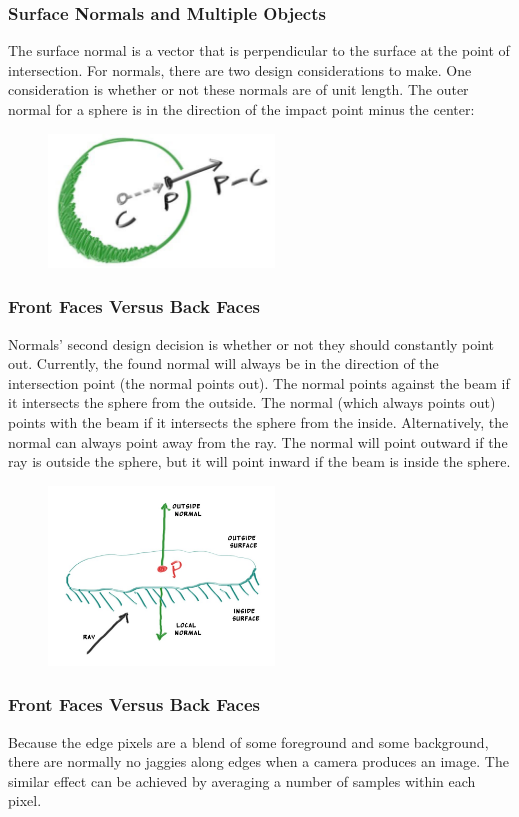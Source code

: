 \documentclass[conference]{IEEEtran}
\begin{document}
\subsubsection{Surface Normals and Multiple Objects}
The surface normal is a vector that is perpendicular to the surface at the point of intersection. For normals, there are two design considerations to make. One consideration is whether or not these normals are of unit length. The outer normal for a sphere is in the direction of the impact point minus the center:
\begin{figure}[h]
\includegraphics[width=6cm]{images/ch6-1.jpg}
\centering
\end{figure}
\subsubsection{Front Faces Versus Back Faces}
Normals' second design decision is whether or not they should constantly point out. Currently, the found normal will always be in the direction of the intersection point (the normal points out). The normal points against the beam if it intersects the sphere from the outside. The normal (which always points out) points with the beam if it intersects the sphere from the inside. Alternatively, the normal can always point away from the ray. The normal will point outward if the ray is outside the sphere, but it will point inward if the beam is inside the sphere.
\begin{figure}[h]
\includegraphics[width=6cm]{images/ch6-2.jpg}
\centering
\end{figure}
\subsubsection{Front Faces Versus Back Faces}
Because the edge pixels are a blend of some foreground and some background, there are normally no jaggies along edges when a camera produces an image. The similar effect can be achieved by averaging a number of samples within each pixel. 
\end{document}
